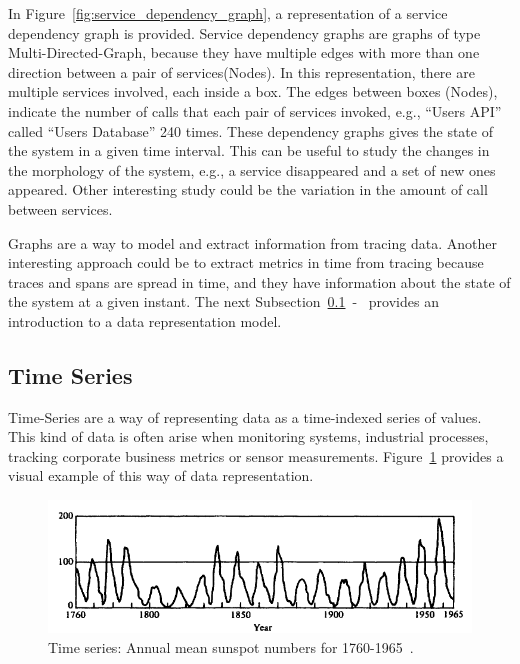 In Figure~\ref{fig:service_dependency_graph}, a representation of a service dependency graph is provided. Service dependency graphs are graphs of type Multi-Directed-Graph, because they have multiple edges with more than one direction between a pair of services(Nodes). In this representation, there are multiple services involved, each inside a box. The edges between boxes (Nodes), indicate the number of calls that each pair of services invoked, e.g., ``Users API'' called ``Users Database'' 240 times. These dependency graphs gives the state of the system in a given time interval. This can be useful to study the changes in the morphology of the system, e.g., a service disappeared and a set of new ones appeared. Other interesting study could be the variation in the amount of call between services.

Graphs are a way to model and extract information from tracing data. Another interesting approach could be to extract metrics in time from tracing because traces and spans are spread in time, and they have information about the state of the system at a given instant. The next Subsection~\ref{subsec:time_series}~-~ provides an introduction to a data representation model.

\subsection{Time Series}
\label{subsec:time_series}

Time-Series are a way of representing data as a time-indexed series of values. This kind of data is often arise when monitoring systems, industrial processes, tracking corporate business metrics or sensor measurements. Figure~\ref{fig:time_series_example} provides a visual example of this way of data representation.

\begin{figure}[H]
    \centering
    \includegraphics[width=1.00\textwidth]{images/time_series_example.pdf}
    \caption{Time series: Annual mean sunspot numbers for 1760-1965~\cite{Brillinger2006}.}
    \label{fig:time_series_example}
\end{figure}


